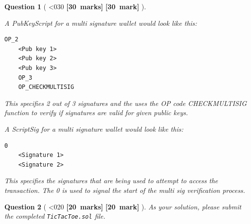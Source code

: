 \documentclass[a4paper]{article}
\theoremstyle{que}
\newtheorem{question}{Question}
\newcommand\points[1]{%
\ifnum1<0#1\relax%
    {\bf \small [#1~marks]}%
  \else%
    {\bf \small [#1~mark]}%
  \fi%
}%
\begin{document}
\begin{question}[\points{30}]
\begin{enumerate}[label=(\alph*)]
    A PubKeyScript for a multi signature wallet would look like this:
    \begin{lstlisting}[basicstyle=\ttfamily, breaklines=true]
    OP_2 
    <Pub key 1>
    <Pub key 2>
    <Pub key 3>
    OP_3
    OP_CHECKMULTISIG
    \end{lstlisting}
    This specifies 2 out of 3 signatures and the uses the OP code CHECKMULTISIG function to verify if signatures are valid for given public keys.

    A ScriptSig for a multi signature wallet would look like this:
    \begin{lstlisting}[basicstyle=\ttfamily, breaklines=true]
    0
    <Signature 1>
    <Signature 2>
    \end{lstlisting}
    This specifies the signatures that are being used to attempt to access the transaction. The 0 is used to signal the start of the multi sig verification process.
  \end{enumerate}
\end{question}

\newpage


\begin{question}[\points{20}]
  As your solution, please submit the completed {\tt TicTacToe.sol} file.
\end{question}

\newpage
\printbibliography
\end{document}
